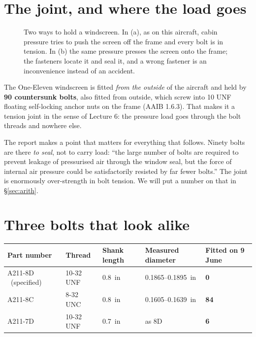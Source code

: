 \documentclass[11pt,a4paper]{article}
\begin{document}
\section{The joint, and where the load goes}

\begin{figure}[H]\centering
\resizebox{0.92\textwidth}{!}{}
\caption{Two ways to hold a windscreen. In (a), as on this aircraft, cabin pressure tries to push
the screen off the frame and every bolt is in tension. In (b) the same pressure presses the screen
onto the frame; the fasteners locate it and seal it, and a wrong fastener is an inconvenience
instead of an accident.}
\label{fig:joint}
\end{figure}

The One-Eleven windscreen is fitted \emph{from the outside} of the aircraft and held by
\textbf{90 countersunk bolts}, also fitted from outside, which screw into 10 UNF floating
self-locking anchor nuts on the frame (AAIB 1.6.3). That makes it a tension joint in the sense of
Lecture 6: the pressure load goes through the bolt threads and nowhere else.

\medskip
The report makes a point that matters for everything that follows. Ninety bolts are there
\emph{to seal}, not to carry load: ``the large number of bolts are required to prevent leakage of
pressurised air through the window seal, but the force of internal air pressure could be
satisfactorily resisted by far fewer bolts.'' The joint is enormously over-strength in bolt
tension. We will put a number on that in \S\ref{sec:arith}.

\section{Three bolts that look alike}

\begin{center}\small
\begin{tabular}{@{}lllll@{}}
\toprule
Part number & Thread & Shank length & Measured diameter & Fitted on 9 June\\
\midrule
A211-8D \ (specified) & 10-32 UNF & \SI{0.8}{in} & 0.1865--\SI{0.1895}{in} & \textbf{0}\\
A211-8C & 8-32 UNC & \SI{0.8}{in} & 0.1605--\SI{0.1639}{in} & \textbf{84}\\
A211-7D & 10-32 UNF & \SI{0.7}{in} & as 8D & \textbf{6}\\
\bottomrule
\end{tabular}
\end{center}
\end{document}
